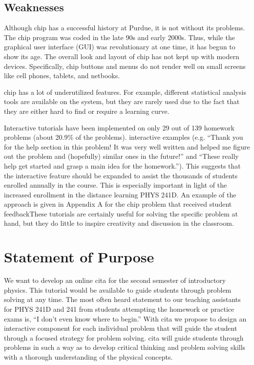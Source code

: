 \subsection{Weaknesses}

Although \gls{chip} has a successful history at Purdue, it is not without its problems. The \gls{chip} program was coded in the late 90s and early 2000s. Thus, while the graphical user interface (GUI) was revolutionary at one time, it has begun to show its age. The overall look and layout of \gls{chip} has not kept up with modern devices. Specifically, \gls{chip} buttons and menus do not render well on small screens like cell phones, tablets, and netbooks.

\gls{chip} has a lot of underutilized features. For example, different statistical analysis tools are available on the system, but they are rarely used due to the fact that they are either hard to find or require a learning curve.

Interactive tutorials have been implemented on only 29 out of 139 homework problems (about 20.9\% of the problems). interactive examples (e.g. ``Thank you for the help section in this problem! It was very well written and helped me figure out the problem and (hopefully) similar ones in the future!'' and ``These really help get started and grasp a main idea for the homework.''). This suggests that the interactive feature should be expanded to assist the thousands of students enrolled annually in the course. This is especially important in light of the increased enrollment in the distance learning PHYS 241D. An example of the approach is given in Appendix A for the \gls{chip} problem that received student feedbackThese tutorials are certainly useful for solving the specific problem at hand, but they do little to inspire creativity and discussion in the classroom.

\section{Statement of Purpose}

We want to develop an online \gls{cita} for the second semester of introductory physics. This tutorial would be available to guide students through problem solving at any time. The most often heard statement to our teaching assistants for PHYS 241D and 241 from students attempting the homework or practice exams is, ``I don’t even know where to begin.''  With \gls{cita} we propose to design an interactive component for each individual problem that will guide the student through a focused strategy for problem solving. \gls{cita} will guide students through problems in such a way as to develop critical thinking and problem solving skills with a thorough understanding of the physical concepts.


